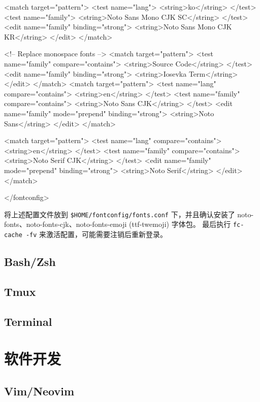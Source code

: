 \begin{lstcode}[numbers=none]
  <match target="pattern">
    <test name="lang">
      <string>ko</string>
    </test>
    <test name="family">
      <string>Noto Sans Mono CJK SC</string>
    </test>
    <edit name="family" binding="strong">
      <string>Noto Sans Mono CJK KR</string>
    </edit>
  </match>
  
  <!-- Replace monospace fonts -->
  <match target="pattern">
    <test name="family" compare="contains">
      <string>Source Code</string>
    </test>
    <edit name="family" binding="strong">
      <string>Iosevka Term</string>
    </edit>
  </match>
    <match target="pattern">
    <test name="lang" compare="contains">
      <string>en</string>
    </test>
    <test name="family" compare="contains">
      <string>Noto Sans CJK</string>
    </test>
    <edit name="family" mode="prepend" binding="strong">
      <string>Noto Sans</string>
    </edit>
  </match>

  <match target="pattern">
    <test name="lang" compare="contains">
      <string>en</string>
    </test>
    <test name="family" compare="contains">
      <string>Noto Serif CJK</string>
    </test>
    <edit name="family" mode="prepend" binding="strong">
      <string>Noto Serif</string>
    </edit>
  </match>

</fontconfig>
\end{lstcode}

将上述配置文件放到 \lstinline{$HOME/fontconfig/fonts.conf} 下，并且确认安装了 noto-fonts、noto-fonts-cjk、noto-fonts-emoji (ttf-twemoji) 字体包。
最后执行 \lstinline{fc-cache -fv} 来激活配置，可能需要注销后重新登录。

\subsection{Bash/Zsh}

\subsection{Tmux}

\subsection{Terminal}

\section{软件开发}
\subsection{Vim/Neovim}

